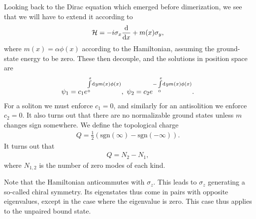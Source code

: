 Looking back to the Dirac equation which emerged before dimerization, we see that we will have to extend it according to
\begin{align*}
	\mathcal{H} = -i\sigma_{x}\dv{x} + m(x)\sigma_{y},
\end{align*}
where $m(x) = \alpha\phi(x)$ according to the Hamiltonian, assuming the ground-state energy to be zero. These then decouple, and the solutions in position space are
\begin{align*}
	\psi_{1} = c_{1}e^{\int\limits_{0}^{x}\dd[]{y}m(x)\phi(x)},\ \psi_{2} = c_{2}e^{-\int\limits_{0}^{x}\dd[]{y}m(x)\phi(x)}.
\end{align*}
For a soliton we must enforce $c_{1} = 0$, and similarly for an antisolition we enforce $c_{2} = 0$. It also turns out that there are no normalizable ground states unless $m$ changes sign somewhere. We define the topological charge
\begin{align*}
	Q = \frac{1}{2}\left(\text{sgn}(\infty) - \text{sgn}(-\infty)\right).
\end{align*}
It turns out that
\begin{align*}
	Q = N_{2} - N_{1},
\end{align*}
where $N_{1, 2}$ is the number of zero modes of each kind.

Note that the Hamiltonian anticommutes with $\sigma_{z}$. This leads to $\sigma_{z}$ generating a so-called chiral symmetry. Its eigenstates thus come in pairs with opposite eigenvalues, except in the case where the eigenvalue is zero. This case thus applies to the unpaired bound state.